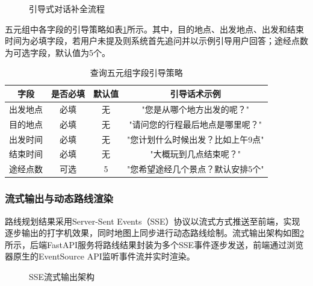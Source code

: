\begin{figure}[hbt]
  \centering
  \caption{引导式对话补全流程}
  \label{fig:ch5_guide_flow}
\end{figure}

五元组中各字段的引导策略如表\ref{tab:ch5_guide}所示。其中，目的地点、出发地点、出发和结束时间为必填字段，若用户未提及则系统首先追问并以示例引导用户回答；途经点数为可选字段，默认值为5个。

\begin{table}[hbt]
  \centering
  \caption{查询五元组字段引导策略}
  \label{tab:ch5_guide}
  \begin{tabular*}{0.92\textwidth}{@{\extracolsep{\fill}}cccc}
  \toprule
    字段 & 是否必填 & 默认值 & 引导话术示例 \\
  \midrule
  	出发地点 & 必填 & 无 & "您是从哪个地方出发的呢？" \\
    目的地点 & 必填 & 无 & "请问您的行程最后地点是哪里呢？" \\
    出发时间 & 必填 & 无 & "您计划什么时候出发？比如上午9点" \\
    结束时间 & 必填 & 无 & "大概玩到几点结束呢？" \\
    途经点数 & 可选 & 5 & "您希望途经几个景点？默认安排5个" \\
  \bottomrule
  \end{tabular*}
\end{table}

\subsubsection{流式输出与动态路线渲染}

路线规划结果采用Server-Sent Events（SSE）协议以流式方式推送至前端，实现逐步输出的打字机效果，同时地图上同步进行动态路线绘制。流式输出架构如图\ref{fig:ch5_sse}所示，后端FastAPI服务将路线结果封装为多个SSE事件逐步发送，前端通过浏览器原生的EventSource API监听事件流并实时渲染。

\begin{figure}[hbt]
  \centering
  \caption{SSE流式输出架构}
  \label{fig:ch5_sse}
\end{figure}

